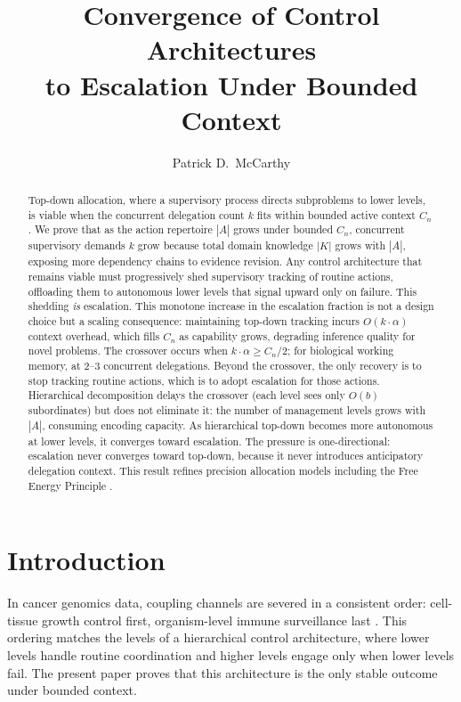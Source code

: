 \documentclass[11pt]{article}
\title{Convergence of Control Architectures\\to Escalation Under Bounded Context}
\author{Patrick D.\ McCarthy}
\date{}
\theoremstyle{definition}
\begin{document}
\maketitle

\begin{abstract}
Top-down allocation, where a supervisory process directs subproblems
to lower levels, is viable when the concurrent delegation count $k$
fits within bounded active context $C_n$. We prove that as the action repertoire $|A|$ grows under bounded
$C_n$, concurrent supervisory demands $k$ grow because total domain
knowledge $|K|$ grows with $|A|$, exposing more dependency chains to
evidence revision. Any control architecture that remains viable must
progressively shed supervisory tracking of routine actions, offloading
them to autonomous lower levels that signal upward only on failure. This shedding \emph{is} escalation.
This monotone increase in the escalation fraction is not a design
choice but a scaling consequence:
maintaining top-down tracking incurs $O(k \cdot \alpha)$ context
overhead, which fills $C_n$ as capability grows, degrading inference
quality for novel problems. The crossover occurs when $k \cdot \alpha
\geq C_n / 2$; for biological working memory, at 2--3 concurrent
delegations. Beyond the crossover, the only recovery is to stop
tracking routine actions, which is to adopt escalation for those
actions. Hierarchical decomposition delays the crossover (each level
sees only $O(b)$ subordinates) but does not eliminate it: the number
of management levels grows with $|A|$, consuming encoding capacity.
As hierarchical top-down becomes more autonomous at lower levels, it
converges toward escalation. The pressure is one-directional:
escalation never converges toward top-down, because it never
introduces anticipatory delegation context. This result refines
precision allocation models including the Free Energy Principle
\cite{Friston2010,Friston2017}.
\end{abstract}

\section{Introduction}
\label{sec:intro}

In cancer genomics data, coupling channels are severed in a
consistent order: cell-tissue growth control first, organism-level
immune surveillance last \cite{McCarthy2026e}. This ordering matches
the levels of a hierarchical control architecture, where lower
levels handle routine coordination and higher levels engage only
when lower levels fail. The present paper proves that this
architecture is the only stable outcome under bounded context.
\end{document}
